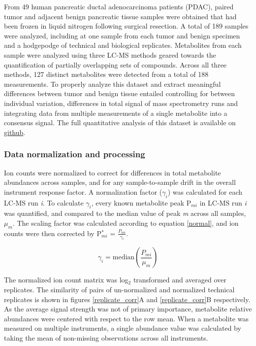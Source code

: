 From 49 human pancreatic ductal adenocarcinoma patients (PDAC), paired tumor and adjacent benign pancreatic tissue samples were obtained that had been frozen in liquid nitrogen following surgical resection.  A total of 189 samples were analyzed, including at one sample from each tumor and benign specimen and a hodgepodge of technical and biological replicates.  Metabolites from each sample were analyzed using three LC-MS methods geared towards the quantification of partially overlapping sets of compounds. Across all three methods, 127 distinct metabolites were detected from a total of 188 measurements.  To properly analyze this dataset and extract meaningful differences between tumor and benign tissue entailed controlling for between individual variation, differences in total signal of mass spectrometry runs and integrating data from multiple measurements of a single metabolite into a consensus signal. The full quantitative analysis of this dataset is available on \href{https://github.com/shackett/Pancreatic_tumor_metabolomics}{github}.

\subsubsection{Data normalization and processing}

Ion counts were normalized to correct for differences in total metabolite abundances across samples, and for any sample-to-sample drift in the overall instrument response factor.  A normalization factor ($\gamma_{i}$) was calculated for each LC-MS run \textit{i}.  To calculate $\gamma_{i}$, every known metabolite peak P$_{mi}$ in LC-MS run \textit{i} was quantified, and compared to the median value of peak \textit{m} across all samples, $\mu_{m}$.  The scaling factor was calculated according to equation \ref{normal}, and ion counts were then corrected by P$^{*}_{mi}$ = $\frac{P_{mi}}{\gamma_{i}}$.

\begin{equation}
\gamma_{i} = \text{median}(\frac{P_{mi}}{\mu_{m}})
\label{normal}
\end{equation}

The normalized ion count matrix was log$_{2}$ transformed and averaged over replicates.  The similarity of pairs of un-normalized and normalized technical replicates is shown in figures \ref{replicate_corr}A and \ref{replicate_corr}B respectively.  As the average signal strength was not of primary importance, metabolite relative abundances were centered with respect to the row mean.  When a metabolite was measured on multiple instruments, a single abundance value was calculated by taking the mean of non-missing observations across all instruments.

